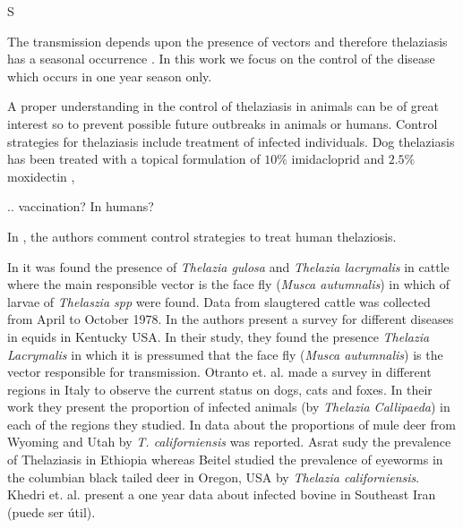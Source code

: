 S\documentclass[preprint,12pt]{elsarticle}
\begin{document}
\noindent The transmission depends upon the presence of vectors and therefore thelaziasis has a seasonal occurrence \cite{Asrat:2016}. In this work we focus on the control of the disease which occurs in one year season only.

\noindent A proper understanding in the control of thelaziasis in animals can be of great interest so to prevent possible future outbreaks in animals or humans. Control strategies for thelaziasis include treatment of infected individuals. Dog thelaziasis has been treated with a topical formulation of $10\%$ imidacloprid and $2.5\%$ moxidectin \cite{Bianciardi:2005},

..
vaccination? In humans?

In \cite{shen:2006}, the authors comment control strategies to treat human thelaziosis.






\noindent In \cite{Moolenbeek:1980} it was found the presence of \textit{Thelazia gulosa} and \textit{Thelazia lacrymalis} in cattle where the main responsible vector is the face fly (\textit{Musca autumnalis}) in which of larvae of \textit{Thelaszia spp} were found. Data from slaugtered cattle was collected from April to October 1978. In \cite{Lyons:2000} the authors present a survey for different diseases in equids in Kentucky USA. In their study, they found the presence \textit{Thelazia Lacrymalis} in which it is pressumed that the face fly (\textit{Musca autumnalis}) is the vector responsible for transmission. Otranto et. al. \cite{Otranto:2003} made a survey in different regions in Italy to observe the current status on dogs, cats and foxes. In their work they present the proportion of infected animals (by \textit{Thelazia Callipaeda}) in each of the regions they studied. In \cite{Dubay:2000} data about the proportions of mule deer from Wyoming and Utah by \textit{T. californiensis} was reported. Asrat \cite{Asrat:2016} sudy the prevalence of Thelaziasis in Ethiopia whereas Beitel \cite{Beitel:1974} studied the prevalence of eyeworms in the columbian black tailed deer in Oregon, USA by \textit{Thelazia californiensis}. Khedri et. al. \cite{Khedri:2016} present a one year data about infected bovine in Southeast Iran (puede ser útil).
\end{document}
